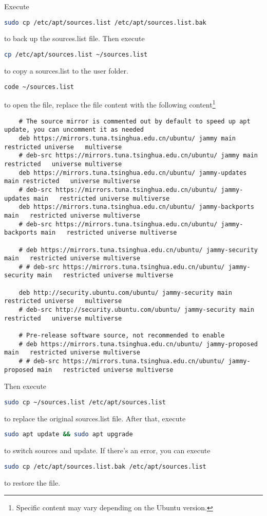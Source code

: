 \documentclass{report}
\begin{document}
Execute 
\begin{lstlisting}[language = bash]
	sudo cp /etc/apt/sources.list /etc/apt/sources.list.bak
\end{lstlisting}
to back up the \textsf{sources.list} file. Then execute
\begin{lstlisting}[language = bash]
	cp /etc/apt/sources.list ~/sources.list
\end{lstlisting}
to copy a \textsf{sources.list} to the user folder. 
\begin{lstlisting}[language = bash]
	code ~/sources.list
\end{lstlisting}
to open the file, replace the file content with the following content\footnote{Specific content may vary depending on the Ubuntu version.}
\begin{lstlisting}
	# The source mirror is commented out by default to speed up apt update, you can uncomment it as needed
	deb https://mirrors.tuna.tsinghua.edu.cn/ubuntu/ jammy main restricted universe   multiverse
	# deb-src https://mirrors.tuna.tsinghua.edu.cn/ubuntu/ jammy main restricted   universe multiverse
	deb https://mirrors.tuna.tsinghua.edu.cn/ubuntu/ jammy-updates main restricted   universe multiverse
	# deb-src https://mirrors.tuna.tsinghua.edu.cn/ubuntu/ jammy-updates main   restricted universe multiverse
	deb https://mirrors.tuna.tsinghua.edu.cn/ubuntu/ jammy-backports main   restricted universe multiverse
	# deb-src https://mirrors.tuna.tsinghua.edu.cn/ubuntu/ jammy-backports main   restricted universe multiverse
	
	# deb https://mirrors.tuna.tsinghua.edu.cn/ubuntu/ jammy-security main   restricted universe multiverse
	# # deb-src https://mirrors.tuna.tsinghua.edu.cn/ubuntu/ jammy-security main   restricted universe multiverse
	
	deb http://security.ubuntu.com/ubuntu/ jammy-security main restricted universe   multiverse
	# deb-src http://security.ubuntu.com/ubuntu/ jammy-security main restricted   universe multiverse
	
	# Pre-release software source, not recommended to enable
	# deb https://mirrors.tuna.tsinghua.edu.cn/ubuntu/ jammy-proposed main   restricted universe multiverse
	# # deb-src https://mirrors.tuna.tsinghua.edu.cn/ubuntu/ jammy-proposed main   restricted universe multiverse
\end{lstlisting}
Then execute
\begin{lstlisting}[language = bash]
	sudo cp ~/sources.list /etc/apt/sources.list
\end{lstlisting}
to replace the original \textsf{sources.list} file. After that, execute
\begin{lstlisting}[language=bash]
	sudo apt update && sudo apt upgrade
\end{lstlisting}
to switch sources and update. If there's an error, you can execute
\begin{lstlisting}[language=bash]
	sudo cp /etc/apt/sources.list.bak /etc/apt/sources.list
\end{lstlisting}
to restore the file.
\end{document}
